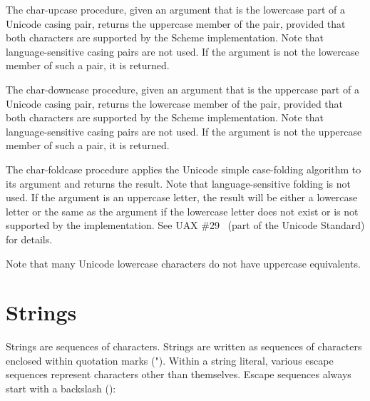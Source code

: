 \begin{entry}{
}


The {\cf char-upcase} procedure, given an argument that is the
lowercase part of a Unicode casing pair, returns the uppercase member
of the pair, provided that both characters are supported by the Scheme
implementation.  Note that language-sensitive casing pairs are not used.  If the
argument is not the lowercase member of such a pair, it is returned.

The {\cf char-downcase} procedure, given an argument that is the
uppercase part of a Unicode casing pair, returns the lowercase member
of the pair, provided that both characters are supported by the Scheme
implementation.  Note that language-sensitive casing pairs are not used.  If the
argument is not the uppercase member of such a pair, it is returned.

The {\cf char-foldcase} procedure applies the Unicode simple
case-folding algorithm to its argument and returns the result.  Note that
language-sensitive folding is not used.  If the argument is an uppercase
letter, the result will be either a lowercase letter
or the same as the argument if the lowercase letter does not exist or
is not supported by the implementation.
See UAX \#29~\cite{uax29} (part of the Unicode Standard) for details.

Note that many Unicode lowercase characters do not have uppercase
equivalents.

\end{entry}


\section{Strings}
\label{stringsection}

Strings are sequences of characters.
\vest Strings are written as sequences of characters enclosed within quotation marks
({\cf "}).  Within a string literal, various escape
sequences represent characters other than
themselves.  Escape sequences always start with a backslash (\backwhack{}):

